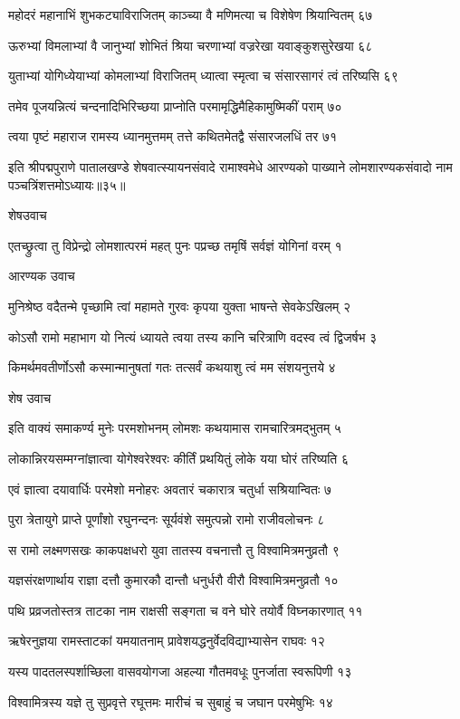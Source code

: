 महोदरं महानाभिं शुभकट्याविराजितम्
काञ्च्या वै मणिमत्या च विशेषेण श्रियान्वितम् ६७

ऊरुभ्यां विमलाभ्यां वै जानुभ्यां शोभितं श्रिया
चरणाभ्यां वज्ररेखा यवाङ्कुशसुरेखया ६८

युताभ्यां योगिध्येयाभ्यां कोमलाभ्यां विराजितम्
ध्यात्वा स्मृत्वा च संसारसागरं त्वं तरिष्यसि ६९

तमेव पूजयन्नित्यं चन्दनादिभिरिच्छया
प्राप्नोति परमामृद्धिमैहिकामुष्मिकीं पराम् ७०

त्वया पृष्टं महाराज रामस्य ध्यानमुत्तमम्
तत्ते कथितमेतद्वै संसारजलधिं तर ७१

इति श्रीपद्मपुराणे पातालखण्डे शेषवात्स्यायनसंवादे रामाश्वमेधे आरण्यको पाख्याने लोमशारण्यकसंवादो नाम पञ्चत्रिंशत्तमोऽध्यायः॥३५॥


शेषउवाच

एतच्छ्रुत्वा तु विप्रेन्द्रो लोमशात्परमं महत्
पुनः पप्रच्छ तमृषिं सर्वज्ञं योगिनां वरम् १

आरण्यक उवाच

मुनिश्रेष्ठ वदैतन्मे पृच्छामि त्वां महामते
गुरवः कृपया युक्ता भाषन्ते सेवकेऽखिलम् २

कोऽसौ रामो महाभाग यो नित्यं ध्यायते त्वया
तस्य कानि चरित्राणि वदस्व त्वं द्विजर्षभ ३

किमर्थमवतीर्णोऽसौ कस्मान्मानुषतां गतः
तत्सर्वं कथयाशु त्वं मम संशयनुत्तये ४

शेष उवाच

इति वाक्यं समाकर्ण्य मुनेः परमशोभनम्
लोमशः कथयामास रामचारित्रमद्भुतम् ५

लोकान्निरयसम्मग्नांज्ञात्वा योगेश्वरेश्वरः
कीर्तिं प्रथयितुं लोके यया घोरं तरिष्यति ६

एवं ज्ञात्वा दयावार्धिः परमेशो मनोहरः
अवतारं चकारात्र चतुर्धा सश्रियान्वितः ७

पुरा त्रेतायुगे प्राप्ते पूर्णांशो रघुनन्दनः
सूर्यवंशे समुत्पन्नो रामो राजीवलोचनः ८

स रामो लक्ष्मणसखः काकपक्षधरो युवा
तातस्य वचनात्तौ तु विश्वामित्रमनुव्रतौ ९

यज्ञसंरक्षणार्थाय राज्ञा दत्तौ कुमारकौ
दान्तौ धनुर्धरौ वीरौ विश्वामित्रमनुव्रतौ १०

पथि प्रव्रजतोस्तत्र ताटका नाम राक्षसी
सङ्गता च वने घोरे तयोर्वै विघ्नकारणात् ११

ऋषेरनुज्ञया रामस्ताटकां यमयातनाम्
प्रावेशयद्धनुर्वेदविद्याभ्यासेन राघवः १२

यस्य पादतलस्पर्शाच्छिला वासवयोगजा
अहल्या गौतमवधूः पुनर्जाता स्वरूपिणी १३

विश्वामित्रस्य यज्ञे तु सुप्रवृत्ते रघूत्तमः
मारीचं च सुबाहुं च जघान परमेषुभिः १४

